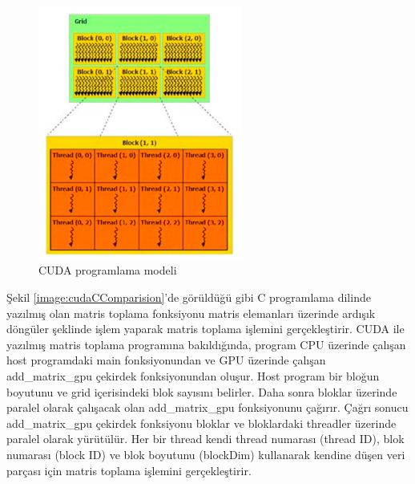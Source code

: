 \begin{figure}[h]
\centering
\shorthandoff{=}
\includegraphics[width=0.6\textwidth]{gorsel/cudaProgrammingStructure.png}
\shorthandoff{=}
\caption{CUDA programlama modeli}
\label{cudaProgrammingStructure}
\end{figure}






Şekil \ref{image:cudaCComparision}’de görüldüğü gibi C programlama dilinde yazılmış olan matris toplama fonksiyonu matris elemanları üzerinde ardışık döngüler şeklinde işlem yaparak matris toplama işlemini gerçekleştirir. CUDA ile yazılmış matris toplama programına bakıldığında, program CPU üzerinde çalışan host programdaki main fonksiyonundan ve GPU üzerinde çalışan add\_matrix\_gpu çekirdek fonksiyonundan oluşur. Host program bir bloğun boyutunu ve grid içerisindeki blok sayısını belirler. Daha sonra bloklar üzerinde paralel olarak çalışacak olan add\_matrix\_gpu fonksiyonunu çağırır. Çağrı sonucu add\_matrix\_gpu çekirdek fonksiyonu bloklar ve bloklardaki threadler üzerinde paralel olarak yürütülür. Her bir thread kendi thread numarası (thread ID), blok numarası (block ID) ve blok boyutunu (blockDim) kullanarak kendine düşen veri parçası için matris toplama işlemini gerçekleştirir. \par


